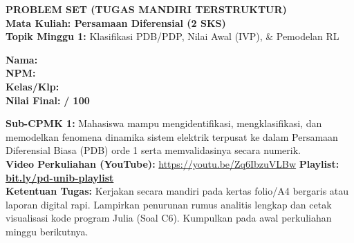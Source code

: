 \documentclass[10pt,a4paper]{article}
\begin{document}
\noindent\begin{minipage}[c]{0.68\textwidth}%
  {\large\textbf{\color{unibblue}PROBLEM SET (TUGAS MANDIRI TERSTRUKTUR)}}\\[1mm]
  {\normalsize\textbf{Mata Kuliah: Persamaan Diferensial (2 SKS)}}\\[0.5mm]
  {\small\textbf{Topik Minggu 1:} Klasifikasi PDB/PDP, Nilai Awal (IVP), \& Pemodelan RL}%
\end{minipage}%
\hfill%
\begin{minipage}[c]{0.30\textwidth}%
  \begin{tcolorbox}[colback=unibblue!5,colframe=unibblue,boxrule=0.6pt,arc=2pt,left=4pt,right=4pt,top=2pt,bottom=2pt]
    \scriptsize
    \textbf{Nama:} \dotfill\\[1.2mm]
    \textbf{NPM:} \dotfill\\[1.2mm]
    \textbf{Kelas/Klp:} \dotfill\\[1.2mm]
    \textbf{Nilai Final:} \hfill \textbf{/ 100}
  \end{tcolorbox}%
\end{minipage}\par

\vspace{1.5mm}

\begin{tcolorbox}[colback=boxbg,colframe=unibgold!90!black,boxrule=0.6pt,arc=2pt,left=5pt,right=5pt,top=3pt,bottom=3pt,title=\textbf{\scriptsize Capaian Pembelajaran (Sub-CPMK 1) \& Pedoman Pengerjaan Tugas}]
  \scriptsize
  \textbf{Sub-CPMK 1:} Mahasiswa mampu mengidentifikasi, mengklasifikasi, dan memodelkan fenomena dinamika sistem elektrik terpusat ke dalam Persamaan Diferensial Biasa (PDB) orde 1 serta memvalidasinya secara numerik.\\
  \textbf{Video Perkuliahan (YouTube):} \url{https://youtu.be/Zq6IbzuVLBw} \hfill \textbf{Playlist:} \href{https://www.youtube.com/playlist?list=PLS5oOZWXZeTw}{\color{unibblue}\textbf{bit.ly/pd-unib-playlist}}\\\textbf{Ketentuan Tugas:} Kerjakan secara mandiri pada kertas folio/A4 bergaris atau laporan digital rapi. Lampirkan penurunan rumus analitis lengkap dan cetak visualisasi kode program Julia (Soal C6). Kumpulkan pada awal perkuliahan minggu berikutnya.
\end{tcolorbox}

\vspace{1.5mm}
\end{document}
